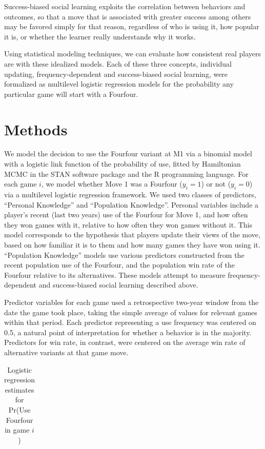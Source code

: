 \documentclass[12pt]{article}
\begin{document}
Success-biased social learning exploits the correlation between behaviors and outcomes, so that a move that is associated with greater success among others may be favored simply for that reason, regardless of who is using it, how popular it is, or whether the learner really understands why it works.

Using statistical modeling techniques, we can evaluate how consistent real players are with these idealized models. Each of these three concepts, individual updating, frequency-dependent and success-biased social learning, were formalized as multilevel logistic regression models for the probability any particular game will start with a Fourfour.

\section{Methods}

We model the decision to use the Fourfour variant at M1 via a binomial model with a logistic link function of the probability of use, fitted by Hamiltonian MCMC in the STAN software package \citep{stan2013stan} and the R programming language. For each game $i$, we model whether Move 1 was a Fourfour ($y_i=1$) or not ($y_i=0$) via a multilevel logistic regression framework. We used two classes of predictors, ``Personal Knowledge'' and ``Population Knowledge''. Personal variables include a player's recent (last two years) use of the Fourfour for Move 1, and how often they won games with it, relative to how often they won games without it. This model corresponds to the hypothesis that players update their views of the move, based on how familiar it is to them and how many games they have won using it. ``Population Knowledge'' models use various predictors constructed from the recent population use of the Fourfour, and the population win rate of the Fourfour relative to its alternatives. These models attempt to measure frequency-dependent and success-biased social learning described above.

Predictor variables for each game used a retrospective two-year window from the date the game took place, taking the simple average of values for relevant games within that period. Each predictor representing a use frequency was centered on 0.5, a natural point of interpretation for whether a behavior is in the majority. Predictors for win rate, in contrast, were centered on the average win rate of alternative variants at that game move.

\begin{table}[t]
  \centering
    \begin{tabular}{lrr}
    
    \end{tabular}
  \caption{Logistic regression estimates for Pr(Use Fourfour in game $i$)}
  \label{table:pr44_logistic_coefs}
\end{table}
\end{document}
